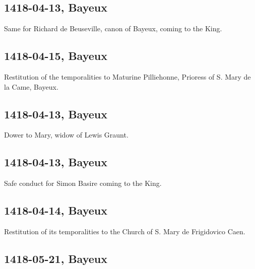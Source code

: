 \documentclass[a4paper,12pt,twoside]{book}
\begin{document}
                
                \subsection{1418-04-13, Bayeux}
                
                
                     Same for Richard de Beuseville, canon of Bayeux, coming to the King.
                  
                
                \subsection{1418-04-15, Bayeux}
                
                
                     Restitution of the temporalities to Maturine Pilliehonne, Prioress of S. Mary de la Came, Bayeux.
                  
                
                \subsection{1418-04-13, Bayeux}
                
                
                     Dower to Mary, widow of Lewis Graunt.
                  
                
                \subsection{1418-04-13, Bayeux}
                
                
                     Safe conduct for Simon Basire coming to the King.
                  
                
                \subsection{1418-04-14, Bayeux}
                
                
                     Restitution of its temporalities to the Church of S. Mary de Frigidovico Caen.
                  
                
                \subsection{1418-05-21, Bayeux}
                
\end{document}
